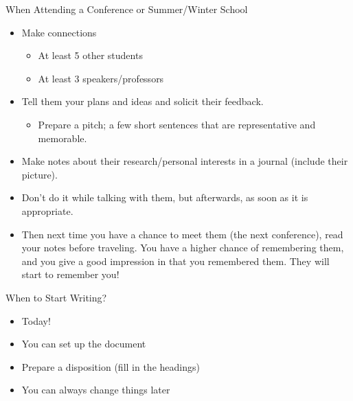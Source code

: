 \documentclass[hyperref={pdfpagelabels=false}, aspectratio=1610]{beamer}
\begin{document}
\begin{frame}
\begin{block}{When Attending a Conference or Summer/Winter School}
 \begin{itemize}
  \item Make connections
  \begin{itemize}
  	\item At least 5 other students
	\item At least 3 speakers/professors
  \end{itemize}
  \item Tell them your plans and ideas and solicit their feedback.
  \begin{itemize}
  	\item Prepare a pitch; a few short sentences that are representative and memorable.
  \end{itemize}
  \item Make notes about their research/personal interests in a journal (include their picture).
  \item Don't do it while talking with them, but afterwards, as soon as it is appropriate.
  \item Then next time you have a chance to meet them (the next conference), read your notes before traveling. You have a higher chance of remembering them, and you give a good impression in that you remembered them. They will start to remember you!
 \end{itemize}
\end{block}
\end{frame}

\begin{frame}
\begin{block}{When to Start Writing?}
 \begin{itemize}
  \item<2-> Today!
  \item<2-> You can set up the document 
  \item<2-> Prepare a disposition (fill in the headings)
  \item<2-> You can always change things later
 \end{itemize}
\end{block}
\end{frame}
\end{document}
